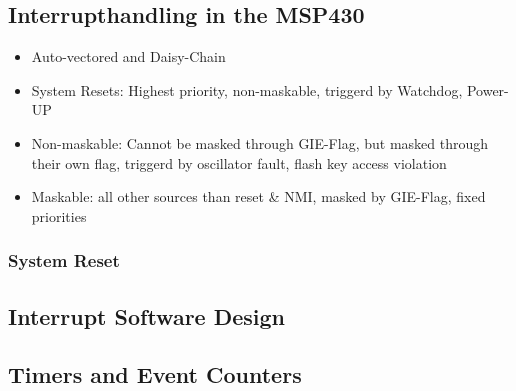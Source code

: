 \subsection{Interrupthandling in the MSP430 }
\begin{itemize}
    \item Auto-vectored and Daisy-Chain
    \item System Resets: Highest priority, non-maskable, triggerd by Watchdog, Power-UP
    \item Non-maskable: Cannot be masked through GIE-Flag, but masked through their own flag, triggerd by oscillator fault, flash key access violation
    \item Maskable: all other sources than reset \& NMI, masked by GIE-Flag, fixed priorities
\end{itemize}
\subsubsection{System Reset}



\subsection{Interrupt Software Design }


\subsection{Timers and Event Counters }
